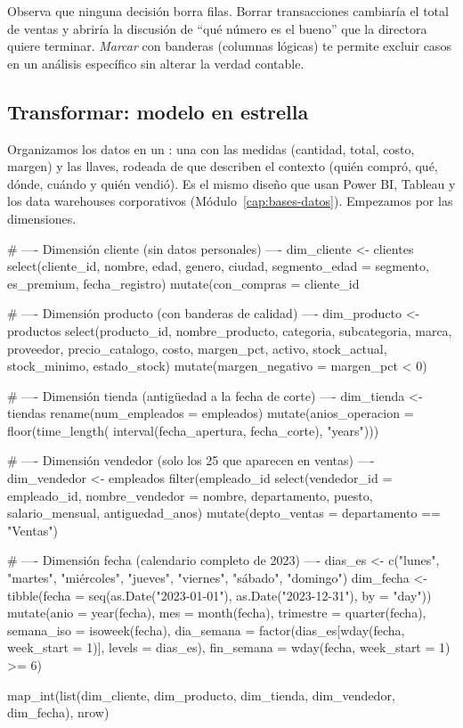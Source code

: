 \begin{consejo}
Observa que ninguna decisión borra filas. Borrar transacciones cambiaría el
total de ventas y abriría la discusión de ``qué número es el bueno'' que la
directora quiere terminar. \emph{Marcar} con banderas (columnas lógicas) te
permite excluir casos en un análisis específico sin alterar la verdad
contable.
\end{consejo}

\subsection{Transformar: modelo en estrella}
\label{sec:m09-estrella}

Organizamos los datos en un : una
 con las medidas (cantidad, total, costo, margen) y
las llaves, rodeada de  que describen el
contexto (quién compró, qué, dónde, cuándo y quién vendió). Es el mismo
diseño que usan Power BI, Tableau y los data warehouses corporativos
(Módulo~\ref{cap:bases-datos}). Empezamos por las dimensiones.

\begin{rcode}
# ---- Dimensión cliente (sin datos personales) ----
dim_cliente <- clientes %
  select(cliente_id, nombre, edad, genero, ciudad, segmento_edad = segmento,
         es_premium, fecha_registro) %
  mutate(con_compras = cliente_id %

# ---- Dimensión producto (con banderas de calidad) ----
dim_producto <- productos %
  select(producto_id, nombre_producto, categoria, subcategoria, marca,
         proveedor, precio_catalogo, costo, margen_pct, activo,
         stock_actual, stock_minimo, estado_stock) %
  mutate(margen_negativo = margen_pct < 0)

# ---- Dimensión tienda (antigüedad a la fecha de corte) ----
dim_tienda <- tiendas %
  rename(num_empleados = empleados) %
  mutate(anios_operacion = floor(time_length(
           interval(fecha_apertura, fecha_corte), "years")))

# ---- Dimensión vendedor (solo los 25 que aparecen en ventas) ----
dim_vendedor <- empleados %
  filter(empleado_id %
  select(vendedor_id = empleado_id, nombre_vendedor = nombre,
         departamento, puesto, salario_mensual, antiguedad_anos) %
  mutate(depto_ventas = departamento == "Ventas")

# ---- Dimensión fecha (calendario completo de 2023) ----
dias_es <- c("lunes", "martes", "miércoles", "jueves", "viernes",
             "sábado", "domingo")
dim_fecha <- tibble(fecha = seq(as.Date("2023-01-01"),
                                as.Date("2023-12-31"), by = "day")) %
  mutate(anio       = year(fecha),
         mes        = month(fecha),
         trimestre  = quarter(fecha),
         semana_iso = isoweek(fecha),
         dia_semana = factor(dias_es[wday(fecha, week_start = 1)],
                             levels = dias_es),
         fin_semana = wday(fecha, week_start = 1) >= 6)

map_int(list(dim_cliente, dim_producto, dim_tienda, dim_vendedor,
             dim_fecha), nrow)
\end{rcode}

